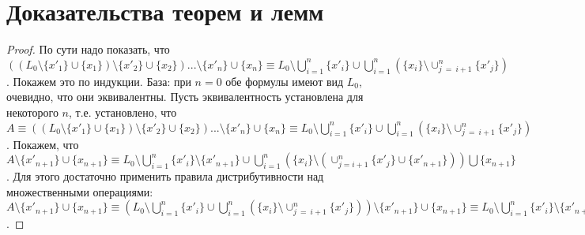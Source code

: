 \chapter{Доказательства теорем и лемм}\label{sec:proofs}

\lemmatext{\ref{L_current}}{\LcurrentBody}

\begin{proof}
По сути надо показать, что $( (L_0 \setminus \{x'_1\} \cup \{x_1\})
\setminus \{x'_2\} \cup \{x_2\}) ... \setminus \{x'_n\} \cup \{x_n\}
\equiv L_0 \setminus \bigcup_{i=1}^n \{x'_i\} \cup \bigcup_{i=1}^n (
\{x_i\} \setminus \cup_{j~=~i+1}^n \{x'_j\})$. Покажем это по
индукции. База: при $n = 0$ обе формулы имеют вид $L_0$, очевидно,
что они эквивалентны. Пусть эквивалентность установлена для
некоторого $n$, т.е. установлено, что $A \equiv ( (L_0 \setminus
\{x'_1\} \cup \{x_1\}) \setminus \{x'_2\} \cup \{x_2\}) ...
\setminus \{x'_n\} \cup \{x_n\} \equiv L_0 \setminus \bigcup_{i=1}^n
\{x'_i\} \cup \bigcup_{i=1}^n ( \{x_i\} \setminus \cup_{j~=~i+1}^n
\{x'_j\})$. Покажем, что $A \setminus \{x'_{n+1}\} \cup \{x_{n+1}\}
\equiv L_0 \setminus \bigcup_{i=1}^n \{x'_i\} \setminus \{x'_{n+1}\}
\cup \bigcup_{i=1}^n ( \{x_i\} \setminus (\cup_{j = i+1}^n \{x'_j\}
\cup \{x'_{n+1}\})) \bigcup \{x_{n+1}\}$. Для этого достаточно
применить правила дистрибутивности над множественными операциями: $A
\setminus \{x'_{n+1}\} \cup \{x_{n+1}\} \equiv (L_0 \setminus
\bigcup_{i=1}^n \{x'_i\} \cup \bigcup_{i=1}^n ( \{x_i\} \setminus
\cup_{j~=~i+1}^n \{x'_j\})) \setminus \{x'_{n+1}\} \cup \{x_{n+1}\}
\equiv L_0 \setminus \bigcup_{i=1}^n \{x'_i\}\setminus \{x'_{n+1}\}
\cup \bigcup_{i=1}^n ( \{x_i\} \setminus \cup_{j~=~i+1}^n \{x'_j\}
\setminus \{x'_{n+1}\} ) \cup \{x_{n+1}\}$.
\end{proof}



